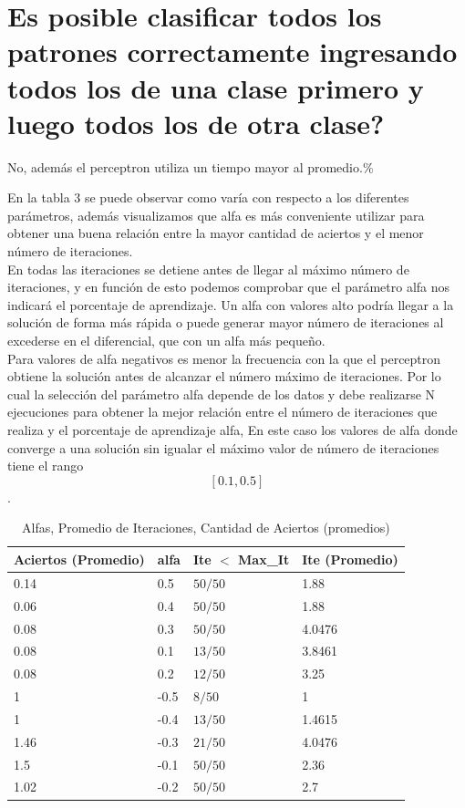 \documentclass[8.5pt,twoside,twocolumn]{article}
\begin{document}
    \section{Es posible clasificar todos los patrones correctamente ingresando todos los de una clase primero y luego todos los de otra clase?}

    No, adem\'as el perceptron utiliza un tiempo mayor al promedio.\%

    En la tabla 3 se puede observar como var\'ia con respecto a los diferentes par\'ametros, adem\'as visualizamos que alfa es
m\'as conveniente utilizar para obtener una buena relaci\'on entre la mayor cantidad de aciertos y el menor n\'umero de iteraciones. 
\\
En todas las iteraciones se detiene antes de llegar al m\'aximo n\'umero de iteraciones, y en funci\'on de esto podemos
comprobar que el par\'ametro alfa nos indicar\'a el porcentaje de aprendizaje. Un alfa con valores alto
podr\'ia llegar a la soluci\'on de forma m\'as r\'apida  o puede generar mayor n\'umero de iteraciones al excederse en el diferencial,  que con un alfa m\'as peque\~no.
\\
Para valores de alfa negativos es menor la frecuencia con la
que el perceptron obtiene la soluci\'on antes de alcanzar el n\'umero m\'aximo de iteraciones.
Por lo cual la selecci\'on del par\'ametro alfa depende de los datos y debe realizarse N ejecuciones
para obtener la mejor relaci\'on entre el n\'umero de iteraciones que realiza y
el porcentaje de aprendizaje alfa, En este caso los valores de alfa donde converge a una soluci\'on
sin igualar el m\'aximo valor de n\'umero de iteraciones tiene el rango $$[0.1, 0.5]$$.

        \begin{table}[h]
        \small
        \caption{ Alfas, Promedio de Iteraciones, Cantidad de Aciertos (promedios) }
        \label{tbl:example}
        \begin{tabular*}{0.5\textwidth}{@{\extracolsep{\fill}}llll}
        \hline
        Aciertos (Promedio) & alfa & Ite $<$ Max\_It & Ite (Promedio)\\
        \hline
        0.14  & 0.5 & $50/50$ & 1.88 \\
        0.06  & 0.4 & $50/50$ & 1.88  \\
        0.08  & 0.3 & $50/50$ & 4.0476 \\
        0.08  & 0.1 & $13/50$ & 3.8461 \\
        0.08  & 0.2 & $12/50$ & 3.25 \\
        1 & -0.5 & $8/50$ & 1 \\
        1 & -0.4 & $13/50$ & 1.4615 \\
        1.46 & -0.3 & $21/50$ & 4.0476 \\
        1.5 & -0.1 & $50/50$ & 2.36 \\
        1.02 & -0.2 & $50/50$ & 2.7 \\
        \hline
        \end{tabular*}
        \end{table}
\end{document}
